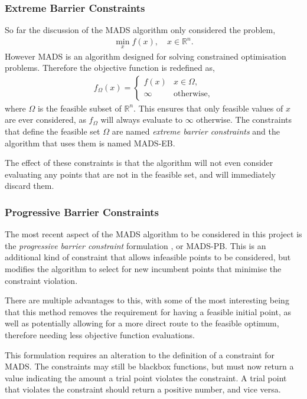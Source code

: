\subsubsection{Extreme Barrier Constraints}\label{subsub:mads_extreme_barrier}
So far the discussion of the \ac{MADS} algorithm only considered the problem, 
\begin{gather}
    \min_x f(x), \quad x\in \mathbb{R}^n.
\end{gather}
However \ac{MADS} is an algorithm designed for solving constrained optimisation problems. Therefore the objective function is redefined as,
\begin{gather}
    f_\Omega(x) =
    \begin{cases}
        f(x) & x \in \Omega, \\ 
        \infty & \text{otherwise},
    \end{cases}
\end{gather}
where $\Omega$ is the feasible subset of $\mathbb{R}^n$. This ensures that only feasible values of $x$ are ever considered, as $f_\Omega$ will always evaluate to $\infty$ otherwise. The constraints that define the feasible set $\Omega$ are named \textit{extreme barrier constraints} and the algorithm that uses them is named \ac{MADS-EB}.

The effect of these constraints is that the algorithm will not even consider evaluating any points that are not in the feasible set, and will immediately discard them. 

\subsubsection{Progressive Barrier Constraints}\label{subsub:mads_progressive_barrier}
The most recent aspect of the \ac{MADS} algorithm to be considered in this project is the \textit{progressive barrier constraint} formulation \cite{Audet2009AProgramming}, or \ac{MADS-PB}. This is an additional kind of constraint that allows infeasible points to be considered, but modifies the algorithm to select for new incumbent points that minimise the constraint violation.

There are multiple advantages to this, with some of the most interesting being that this method removes the requirement for having a feasible initial point, as well as potentially allowing for a more direct route to the feasible optimum, therefore needing less objective function evaluations.

This formulation requires an alteration to the definition of a constraint for \ac{MADS}. The constraints may still be blackbox functions, but must now return a value indicating the amount a trial point violates the constraint. A trial point that violates the constraint should return a positive number, and vice versa.

